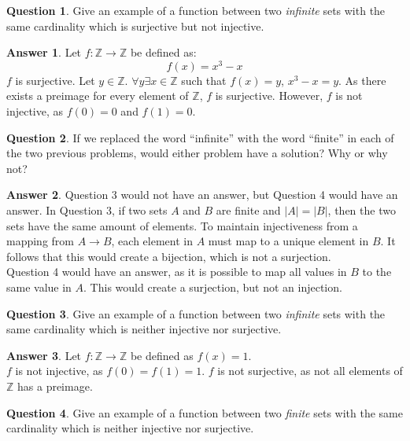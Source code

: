 \documentclass[article, 12pt]{article}
\theoremstyle{definition}
\newtheorem{question}{Question}
\newtheorem{answer}{Answer}
\newcommand{\ints}{\mathbb{Z}}
\begin{document}
    \begin{question}
        Give an example of a function between two \textit{infinite} sets with the same cardinality which is surjective but not injective.
    \end{question}

    \begin{answer}
        Let $f: \ints \to \ints$ be defined as:
        \[ f(x) = x^3 - x \]
        $f$ is surjective. Let $y \in \ints$. $\forall y \exists x \in \ints$ such that $f(x) = y$, $x^3 - x = y$. As there exists a preimage for every element of $\ints$, $f$ is surjective. However, $f$ is not injective, as $f(0) = 0$ and $f(1) = 0$.
    \end{answer}

    \begin{question}
        If we replaced the word “infinite” with the word “finite” in each of the two previous problems, would either problem have a solution? Why or why not?    
    \end{question}

    \begin{answer}
        Question 3 would not have an answer, but Question 4 would have an answer. In Question 3, if two sets $A$ and $B$ are finite and $|A| = |B|$, then the two sets have the same amount of elements. To maintain injectiveness from a mapping from $A \to B$, each element in $A$ must map to a unique element in $B$. It follows that this would create a bijection, which is not a surjection. 
        \\[12pt]
        Question 4 would have an answer, as it is possible to map all values in $B$ to the same value in $A$. This would create a surjection, but not an injection.
    \end{answer}

    \begin{question}
        Give an example of a function between two \textit{infinite} sets with the same cardinality which is neither injective nor surjective.    
    \end{question}

    \begin{answer}
        Let $f: \ints \to \ints$ be defined as $f(x) = 1$. 
        \\[12pt]
        $f$ is not injective, as $f(0) = f(1) = 1$. $f$ is not surjective, as not all elements of $\ints$ has a preimage.
    \end{answer}

    \begin{question}
        Give an example of a function between two \textit{finite} sets with the same cardinality which is neither injective nor surjective.    
    \end{question}
\end{document}

